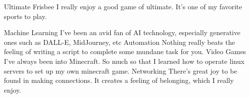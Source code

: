 



\begin{cvskills}
  \cvskill
    {Ultimate Frisbee} %
    {I really enjoy a good game of ultimate. It's one of my favorite sports to play.} %

  \cvskill
    {Machine Learning} %
    {I've been an avid fan of AI technology, especially generative ones such as DALL-E, MidJourney, etc} %
  \cvskill
    {Automation} %
    {Nothing really beats the feeling of writing a script to complete some mundane task for you.} %
  \cvskill
    {Video Games} %
    {I've always been into Minecraft. So much so that I learned how to operate linux servers to set up my own minecraft game.} %
  \cvskill
    {Networking} %
    {There's great joy to be found in making connections. It creates a feeling of belonging, which I really enjoy.} %

\end{cvskills}